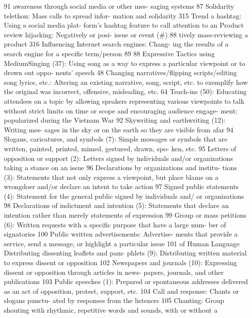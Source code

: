 \documentclass[twoside,a4paper,12pt,fleqn,openany]{extbook}
\begin{document}
 91
awareness through social media or other mes-
saging systems
 87
 Solidarity telethon: Mass calls to spread infor-
mation and solidarity
 315
Trend a hashtag: Using a social media plat-
form’s hashtag feature to call attention to an
 Product review hijacking: Negatively or posi-
issue or event (#)
 88
 tively mass-reviewing a product
 316
Influencing Internet search engines: Chang-
ing the results of a search engine for a specific
term/person
 89
88
Expressive Tactics using MediumSinging (37): Using song as a way to express
a particular viewpoint or to drown out oppo-
nents’ speech
 48
Changing narratives/flipping scripts/editing
song lyrics, etc.: Altering an existing narrative,
song, script, etc. to exemplify how the original
was incorrect, offensive, misleading, etc. 64
Teach-ins (50): Educating attendees on a topic
by allowing speakers representing various
viewpoints to talk without strict limits on time
or scope and encouraging audience engage-
ment; popularized during the Vietnam War 92
Skywriting and earthwriting (12): Writing mes-
sages in the sky or on the earth so they are
visible from afar
 94
Slogans, caricatures, and symbols (7):
Simple messages or symbols that are written,
painted, printed, mimed, gestured, drawn, spo-
ken, etc.
 95
Letters of opposition or support (2): Letters
signed by individuals and/or organizations
taking a stance on an issue
 96
Declarations by organizations and institu-
tions (3): Statements that not only express a
viewpoint, but place blame on a wrongdoer
and/or declare an intent to take action
 97
Signed public statements (4): Statement for
the general public signed by individuals and/
or organizations
 98
Declarations of indictment and intention (5):
Statements that declare an intention rather
than merely statements of expression
 99
Group or mass petitions (6): Written requests
with a specific purpose that have a large num-
ber of signatories
 100
Public written advertisements: Advertise-
ments that provide a service, send a message,
or highlight a particular issue
 101
of Human Language
Distributing dissenting leaflets and pam-
phlets (9): Distributing written material to
express dissent or opposition
 102
Newspapers and journals (10): Expressing
dissent or opposition through articles in news-
papers, journals, and other publications 103
Public speeches (1): Prepared or spontaneous
addresses delivered as an act of opposition,
protest, support, etc.
 104
Call and response: Chants or slogans punctu-
ated by responses from the listeners
 105
Chanting: Group shouting with rhythmic,
repetitive words and sounds, with or without a
\end{document}
